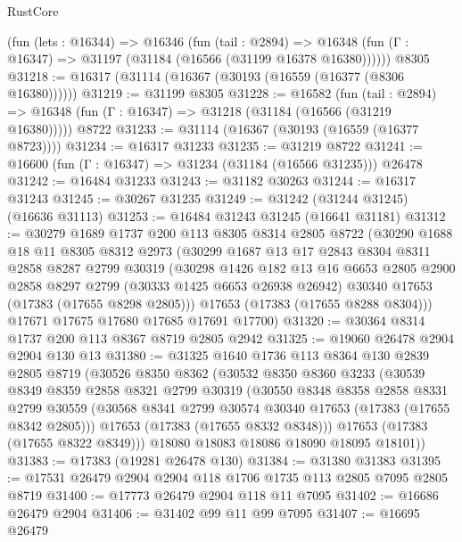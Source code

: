 \begin{lexlean}{RustCore}
\begin{coremodule}
    (fun (lets : @16344) =>
    @16346
      (fun (tail : @2894) =>
      @16348 (fun (Γ : @16347) => @31197 (@31184 (@16566 (@31199 @16378 @16380))))))
    @8305
@31218 := @16317 (@31114 (@16367 (@30193 (@16559 (@16377 (@8306 @16380))))))
@31219 := @31199 @8305
@31228 := @16582
    (fun (tail : @2894) => @16348 (fun (Γ : @16347) => @31218 (@31184 (@16566 (@31219 @16380)))))
    @8722
@31233 := @31114 (@16367 (@30193 (@16559 (@16377 @8723))))
@31234 := @16317 @31233
@31235 := @31219 @8722
@31241 := @16600 (fun (Γ : @16347) => @31234 (@31184 (@16566 @31235))) @26478
@31242 := @16484 @31233
@31243 := @31182 @30263
@31244 := @16317 @31243
@31245 := @30267 @31235
@31249 := @31242 (@31244 @31245) (@16636 @31113)
@31253 := @16484 @31243 @31245 (@16641 @31181)
@31312 := @30279
    @1689
    @1737
    @200
    @113
    @8305
    @8314
    @2805
    @8722
    (@30290
      @1688
      @18
      @11
      @8305
      @8312
      @2973
      (@30299
        @1687
        @13
        @17
        @2843
        @8304
        @8311
        @2858
        @8287
        @2799
        @30319
        (@30298
          @1426
          @182
          @13
          @16
          @6653
          @2805
          @2900
          @2858
          @8297
          @2799
          (@30333 @1425 @6653 @26938 @26942)
          @30340
          @17653
          (@17383 (@17655 @8298 @2805)))
        @17653
        (@17383 (@17655 @8288 @8304)))
      @17671
      @17675
      @17680
      @17685
      @17691
      @17700)
@31320 := @30364 @8314 @1737 @200 @113 @8367 @8719 @2805 @2942
@31325 := @19060 @26478 @2904 @2904 @130 @13
@31380 := @31325
    @1640
    @1736
    @113
    @8364
    @130
    @2839
    @2805
    @8719
    (@30526
      @8350
      @8362
      (@30532
        @8350
        @8360
        @3233
        (@30539
          @8349
          @8359
          @2858
          @8321
          @2799
          @30319
          (@30550
            @8348
            @8358
            @2858
            @8331
            @2799
            @30559
            (@30568 @8341 @2799 @30574 @30340 @17653 (@17383 (@17655 @8342 @2805)))
            @17653
            (@17383 (@17655 @8332 @8348)))
          @17653
          (@17383 (@17655 @8322 @8349)))
        @18080
        @18083
        @18086
        @18090
        @18095
        @18101))
@31383 := @17383 (@19281 @26478 @130)
@31384 := @31380 @31383
@31395 := @17531 @26479 @2904 @2904 @118 @1706 @1735 @113 @2805 @7095 @2805 @8719
@31400 := @17773 @26479 @2904 @118 @11 @7095
@31402 := @16686 @26479 @2904
@31406 := @31402 @99 @11 @99 @7095
@31407 := @16695 @26479

\end{coremodule}
\end{lexlean}
